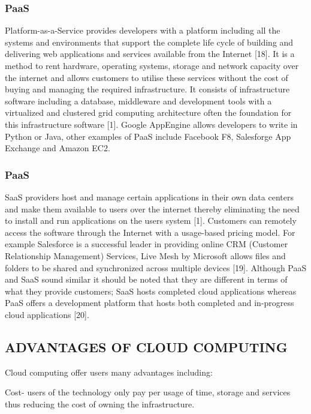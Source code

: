\documentclass[10pt,journal,compsoc]{IEEEtran}
\begin{document}
\subsubsection{PaaS}
\vspace{2mm}
Platform-as-a-Service provides developers with a platform including all the systems and environments that support the complete life cycle of building and delivering web applications and services available from the Internet [18]. It is a method to rent hardware, operating systems, storage and network capacity over the internet and allows customers to utilise these services without the cost of buying and managing the required infrastructure. It consists of infrastructure software including a database, middleware and development tools with a virtualized and clustered grid computing architecture often the foundation for this infrastructure software [1]. Google AppEngine allows developers to write in Python or Java, other examples of PaaS include Facebook F8, Salesforge App Exchange and Amazon EC2.


\subsubsection{PaaS}
\vspace{2mm}
SaaS providers host and manage certain applications in their own data centers and make them available to users over the internet thereby eliminating the need to install and run applications on the users system [1]. Customers can remotely access the software through the Internet with a usage-based pricing model. For example Salesforce is a successful leader in providing online CRM (Customer Relationship Management) Services, Live Mesh by Microsoft allows files and folders to be shared and synchronized across multiple devices [19]. Although PaaS and SaaS sound similar it should be noted that they are different in terms of what they provide customers; SaaS hosts completed cloud applications whereas PaaS offers a development platform that hosts both completed and in-progress cloud applications [20].


\subsection{ADVANTAGES OF CLOUD COMPUTING}

\vspace{2mm}
Cloud computing offer users many advantages including:

\vspace{2mm}
Cost- users of the technology only pay per usage of time, storage and services thus reducing the cost of owning the infrastructure. 
\end{document}
